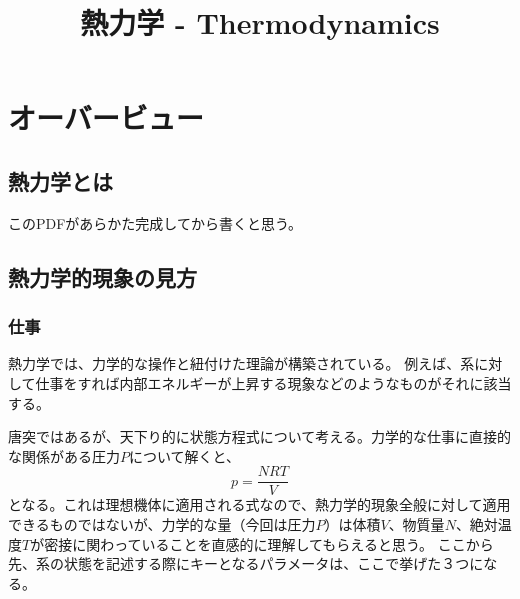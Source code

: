 \documentclass[a4paper]{jsreport}
\title{熱力学 - Thermodynamics}
\begin{document}
    \maketitle

    \tableofcontents

    \chapter{オーバービュー}
        \section{熱力学とは}
        このPDFがあらかた完成してから書くと思う。
        
            
        \section{熱力学的現象の見方}

            \subsection*{仕事}
                熱力学では、力学的な操作と紐付けた理論が構築されている。
                例えば、系に対して仕事をすれば内部エネルギーが上昇する現象などのようなものがそれに該当する。\par
                唐突ではあるが、天下り的に状態方程式について考える。力学的な仕事に直接的な関係がある圧力$P$について解くと、
                \begin{equation}
                    p = \frac{NRT}{V}
                \end{equation}
                となる。これは理想機体に適用される式なので、熱力学的現象全般に対して適用できるものではないが、力学的な量（今回は圧力$P$）は体積$V$、物質量$N$、絶対温度$T$が密接に関わっていることを直感的に理解してもらえると思う。
                ここから先、系の状態を記述する際にキーとなるパラメータは、ここで挙げた３つになる。
\end{document}
